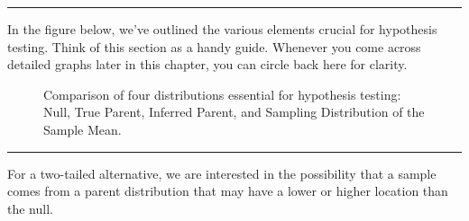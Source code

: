 \documentclass[
  letterpaper,
  DIV=11,
  numbers=noendperiod]{scrreprt}
\begin{document}
\begin{center}\rule{0.5\linewidth}{0.5pt}\end{center}

In the figure below, we've outlined the various elements crucial for
hypothesis testing. Think of this section as a handy guide. Whenever you
come across detailed graphs later in this chapter, you can circle back
here for clarity.

\begin{figure}


\caption{\label{fig-5-5.keyfig}Comparison of four distributions
essential for hypothesis testing: Null, True Parent, Inferred Parent,
and Sampling Distribution of the Sample Mean.}

\end{figure}%

\begin{center}\rule{0.5\linewidth}{0.5pt}\end{center}

For a two-tailed alternative, we are interested in the possibility that
a sample comes from a parent distribution that may have a lower or
higher location than the null.
\end{document}
